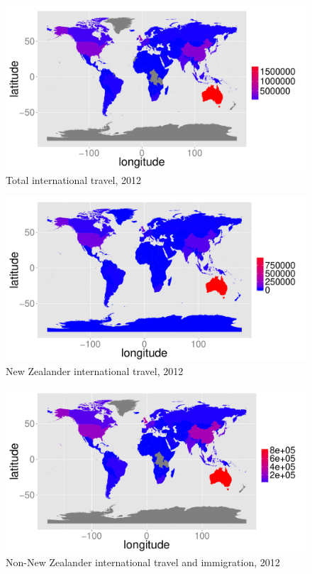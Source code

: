 \documentclass{article}
\begin{document}
\begin{itemize}
\begin{figure}
\begin{center}
\includegraphics{draftfinalreport-039}
\end{center}
\caption{Total international travel, 2012 }
\label{fig:travel12}
\end{figure}

\begin{figure}
\begin{center}
\includegraphics{draftfinalreport-040}
\end{center}
\caption{New Zealander international travel, 2012 }
\label{fig:nztravel12}
\end{figure}

\begin{figure}
\begin{center}
\includegraphics{draftfinalreport-041}
\end{center}
\caption{Non-New Zealander international travel and immigration, 2012 }
\label{fig:immigration12}
\end{figure}


\end{itemize}
\end{document}
